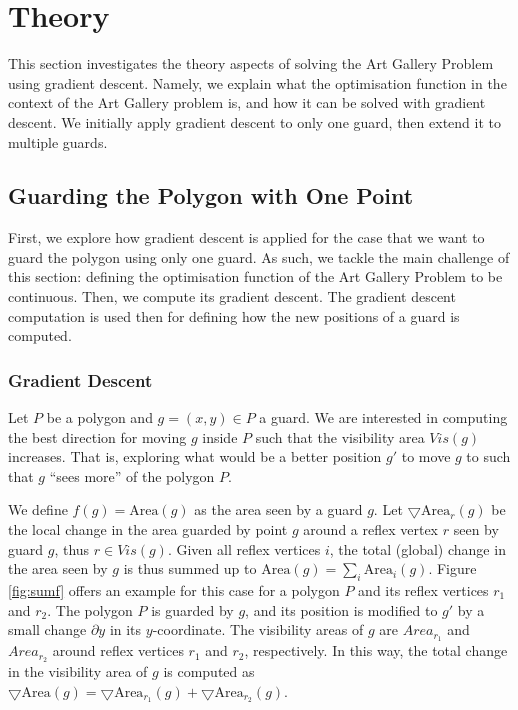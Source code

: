 \section{Theory}
\label{sec:theory}

This section investigates the theory aspects of solving the Art Gallery Problem using gradient descent. Namely, we explain what the optimisation function in the context of the Art Gallery problem is, and how it can be solved with gradient descent. We initially apply gradient descent to only one guard, then extend it to multiple guards.

\subsection{Guarding the Polygon with One Point}

First, we explore how gradient descent is applied for the case that we want to guard the polygon using only one guard. As such, we tackle the main challenge of this section: defining the optimisation function of the Art Gallery Problem to be continuous. Then, we compute its gradient descent. The gradient descent computation is used then for defining how the new positions of a guard is computed.

\subsubsection{Gradient Descent}
\label{sec:gradient}

Let $P$ be a polygon and $g = (x, y) \in P$ a guard. We are interested in computing the best direction for moving $g$ inside $P$ such that the visibility area $\mathit{Vis}(g)$ increases. That is, exploring what would be a better position $g'$ to move $g$ to such that $g$ ``sees more'' of the polygon $P$. 

We define $f(g) = \text{Area}(g)$ as the area seen by a guard $g$. Let $\bigtriangledown \text{Area}_r(g)$ be the local change in the area guarded by point $g$ around a reflex vertex $r$ seen by guard $g$, thus $r \in \mathit{Vis(g)}$. Given all reflex vertices $i$, the total (global) change in the area seen by $g$ is thus summed up to $\text{Area}(g) = \sum_i \text{Area}_i(g)$. Figure \ref{fig:sumf} offers an example for this case for a polygon $P$ and its reflex vertices $r_1$ and $r_2$. The polygon $P$ is guarded by $g$, and its position is modified to $g'$ by a small change $\partial y$ in its $y$-coordinate. The visibility areas of $g$ are $Area_{r_1}$ and $Area_{r_2}$ around reflex vertices $r_1$ and $r_2$, respectively. In this way, the total change in the visibility area of $g$ is computed as $\bigtriangledown \text{Area}(g) = \bigtriangledown \text{Area}_{r_1}(g) + \bigtriangledown \text{Area}_{r_2}(g)$.

